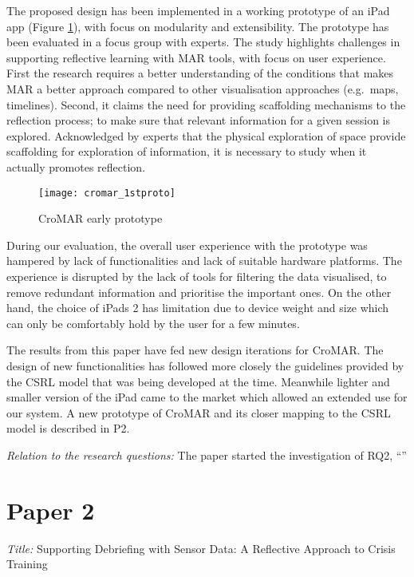 The proposed design has been implemented in a working prototype of an iPad app (Figure \ref{fig:cromar-prototype}), with focus on modularity and extensibility. The prototype has been evaluated in a focus group with experts. The study highlights challenges in supporting reflective learning with MAR tools, with focus on user experience. First the research requires a better understanding of the conditions that makes MAR a better approach compared to other visualisation approaches (e.g.~maps, timelines). Second, it claims the need for providing scaffolding mechanisms to the reflection process; to make sure that relevant information for a given session is explored. Acknowledged by experts that the physical exploration of space provide scaffolding for exploration of information, it is necessary to study when it actually promotes reflection. 

\begin{figure}
	[tbh] \centering 
	\texttt{[image: cromar\_1stproto]} \caption{CroMAR early prototype} \label{fig:cromar-prototype} 
\end{figure}

During our evaluation, the overall user experience with the prototype was hampered by lack of functionalities and lack of suitable hardware platforms. The experience is disrupted by the lack of tools for filtering the data visualised, to remove redundant information and prioritise the important ones. On the other hand, the choice of iPads 2 has limitation due to device weight and size which can only be comfortably hold by the user for a few minutes.

The results from this paper have fed new design iterations for CroMAR. The design of new functionalities has followed more closely the guidelines provided by the CSRL model that was being developed at the time. Meanwhile lighter and smaller version of the iPad came to the market which allowed an extended use for our system. A new prototype of CroMAR and its closer mapping to the CSRL model is described in P2.

\emph{Relation to the research questions: } The paper started the investigation of RQ2, ``\RQii'' 

\section[P2: Supporting Debriefing with Sensor Data: A Reflective Approach to Crisis Training]{Paper 2}\label{paper-2}

\emph{Title:} Supporting Debriefing with Sensor Data: A Reflective Approach to Crisis Training

